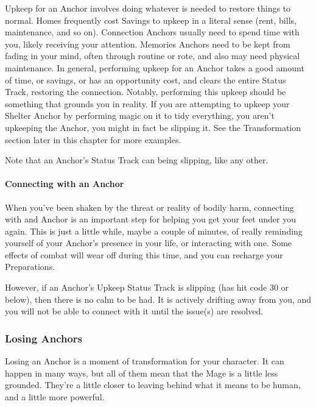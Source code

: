 \documentclass[
]{article}
\begin{document}
Upkeep for an Anchor involves doing whatever is needed to restore things
to normal. Homes frequently cost Savings to upkeep in a literal sense
(rent, bills, maintenance, and so on). Connection Anchors usually need
to spend time with you, likely receiving your attention. Memories
Anchors need to be kept from fading in your mind, often through routine
or rote, and also may need physical maintenance. In general, performing
upkeep for an Anchor takes a good amount of time, or savings, or has an
opportunity cost, and clears the entire Status Track, restoring the
connection. Notably, performing this upkeep should be something that
grounds you in reality. If you are attempting to upkeep your Shelter
Anchor by performing magic on it to tidy everything, you aren't
upkeeping the Anchor, you might in fact be slipping it. See the
Transformation section later in this chapter for more examples.

Note that an Anchor's Status Track can being slipping, like any other.

\hypertarget{connecting-with-an-anchor}{%
\paragraph{Connecting with an Anchor}\label{connecting-with-an-anchor}}

When you've been shaken by the threat or reality of bodily harm,
connecting with and Anchor is an important step for helping you get your
feet under you again. This is just a little while, maybe a couple of
minutes, of really reminding yourself of your Anchor's presence in your
life, or interacting with one. Some effects of combat will wear off
during this time, and you can recharge your Preparations.

However, if an Anchor's Upkeep Status Track is slipping (has hit code 30
or below), then there is no calm to be had. It is actively drifting away
from you, and you will not be able to connect with it until the issue(s)
are resolved.

\hypertarget{losing-anchors}{%
\subsubsection{Losing Anchors}\label{losing-anchors}}

Losing an Anchor is a moment of transformation for your character. It
can happen in many ways, but all of them mean that the Mage is a little
less grounded. They're a little closer to leaving behind what it means
to be human, and a little more powerful.
\end{document}
